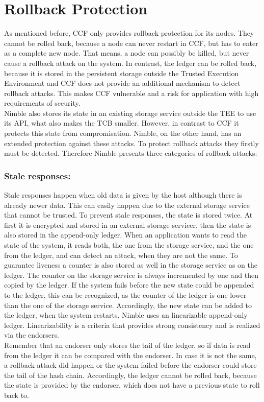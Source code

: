 \section{Rollback Protection}
As mentioned before, CCF only provides rollback protection for its nodes. They cannot be rolled back, because a node can never restart in CCF, but has to enter as a complete new node. That means, a node can possibly be killed, but never cause a rollback attack on the system. In contrast, the ledger can be rolled back, because it is stored in the persistent storage outside the Trusted Execution Environment and CCF does not provide an additional mechanism to detect rollback attacks. This makes CCF vulnerable and a risk for application with high requirements of security.\\
 Nimble also stores its state in an existing storage service outside the TEE to use its API, what also makes the TCB smaller. However, in contrast to CCF it protects this state from compromisation. Nimble, on the other hand, has an extended protection against these attacks. To protect rollback attacks they firstly must be detected. Therefore Nimble presents three categories of rollback attacks:
	\subsubsection*{Stale responses:} Stale responses happen when old data is given by the host although there is already newer data. This can easily happen due to the external storage service that cannot be trusted. To prevent stale responses, the state is stored twice. At first it is encrypted and stored in an external storage servicer, then the state is also stored in the append-only ledger. When an application wants to read the state of the system, it reads both, the one from the storage service, and the one from the ledger, and can detect an attack, when they are not the same. To guarantee liveness a counter is also stored as well in the storage service as on the ledger. The counter on the storage service is always incremented by one and then copied by the ledger. If the system fails before the new state could be appended to the ledger, this can be recognized, as the counter of the ledger is one lower than the one of the storage service. Accordingly, the new state can be added to the ledger, when the system restarts. Nimble uses an linearizable append-only ledger. Linearizability is a criteria that provides strong consistency and is realized via the endorsers.\\
	 Remember that an endorser only stores the tail of the ledger, so if data is read from the ledger it can be compared with the endorser. In case it is not the same, a rollback attack did happen or the system failed before the endorser could store the tail of the hash chain. Accordingly, the ledger cannot be rolled back, because the state is provided by the endorser, which does not have a previous state to roll back to. 
